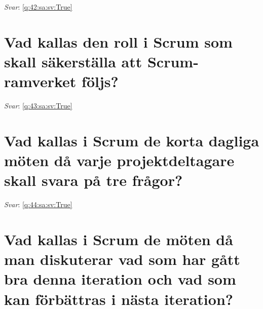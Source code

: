 \documentclass[a4paper,11pt,oneside]{book}
\begin{document}
\begin{sloppypar}
\label{q:42:sa:sv:False}

\vspace{2cm}

\noindent\makebox[\textwidth]{\hrulefill}

\vspace{1cm}

\textit{Svar}: \autoref{q:42:sa:sv:True}



\section{Vad kallas den roll i Scrum som skall s\"akerst\"alla att Scrum-ramverket f\"oljs?}

\label{q:43:sa:sv:False}

\vspace{2cm}

\noindent\makebox[\textwidth]{\hrulefill}

\vspace{1cm}

\textit{Svar}: \autoref{q:43:sa:sv:True}



\section{Vad kallas i Scrum de korta dagliga m\"oten d\r{a} varje projektdeltagare skall svara p\r{a} tre fr\r{a}gor?}

\label{q:44:sa:sv:False}

\vspace{2cm}

\noindent\makebox[\textwidth]{\hrulefill}

\vspace{1cm}

\textit{Svar}: \autoref{q:44:sa:sv:True}



\section{Vad kallas i Scrum de m\"oten d\r{a} man diskuterar vad som har g\r{a}tt bra denna iteration och vad som kan f\"orb\"attras i n\"asta iteration?}

\label{q:45:sa:sv:False}

\vspace{2cm}

\noindent\makebox[\textwidth]{\hrulefill}

\vspace{1cm}


\end{sloppypar}
\end{document}
